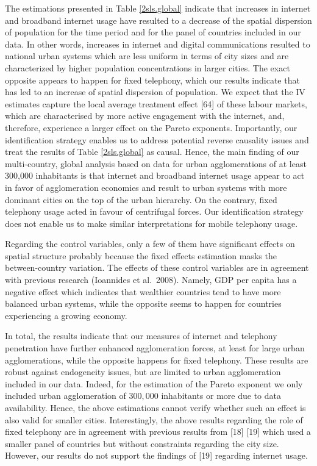 \documentclass[10pt,letterpaper]{article}
\begin{document}
The estimations presented in Table \ref{2sls.global} indicate that
increases in internet and broadband internet usage have resulted to a
decrease of the spatial dispersion of population for the time period and
for the panel of countries included in our data. In other words,
increases in internet and digital communications resulted to national
urban systems which are less uniform in terms of city sizes and are
characterized by higher population concentrations in larger cities. The
exact opposite appears to happen for fixed telephony, which our results
indicate that has led to an increase of spatial dispersion of
population. We expect that the IV estimates capture the local average
treatment effect {[}64{]} of these labour markets, which are
characterised by more active engagement with the internet, and,
therefore, experience a larger effect on the Pareto exponents.
Importantly, our identification strategy enables us to address potential
reverse causality issues and treat the results of Table
\ref{2sls.global} as causal. Hence, the main finding of our
multi-country, global analysis based on data for urban agglomerations of
at least 300,000 inhabitants is that internet and broadband internet
usage appear to act in favor of agglomeration economies and result to
urban systems with more dominant cities on the top of the urban
hierarchy. On the contrary, fixed telephony usage acted in favour of
centrifugal forces. Our identification strategy does not enable us to
make similar interpretations for mobile telephony usage.

Regarding the control variables, only a few of them have significant
effects on spatial structure probably because the fixed effects
estimation masks the between-country variation. The effects of these
control variables are in agreement with previous research (Ioannides et
al.~2008). Namely, GDP per capita has a negative effect which indicates
that wealthier countries tend to have more balanced urban systems, while
the opposite seems to happen for countries experiencing a growing
economy.

In total, the results indicate that our measures of internet and
telephony penetration have further enhanced agglomeration forces, at
least for large urban agglomerations, while the opposite happens for
fixed telephony. These results are robust against endogeneity issues,
but are limited to urban agglomeration included in our data. Indeed, for
the estimation of the Pareto exponent we only included urban
agglomeration of \(300,000\) inhabitants or more due to data
availability. Hence, the above estimations cannot verify whether such an
effect is also valid for smaller cities. Interestingly, the above
results regarding the role of fixed telephony are in agreement with
previous results from {[}18{]} {[}19{]} which used a smaller panel of
countries but without constraints regarding the city size. However, our
results do not support the findings of {[}19{]} regarding internet
usage.
\end{document}
